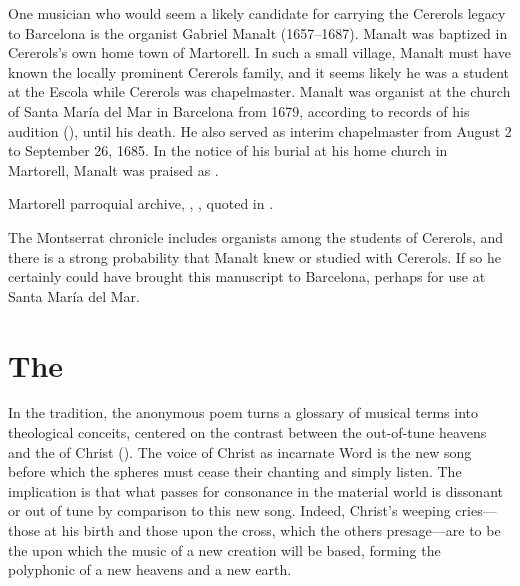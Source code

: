 
One musician who would seem a likely candidate for carrying the Cererols legacy
to Barcelona is the organist Gabriel Manalt (1657--1687).%
    \Autocite{Balanza:CererolsFamily}
Manalt was baptized in Cererols's own home town of Martorell.
In such a small village, Manalt must have known the locally prominent Cererols
family, and it seems likely he was a student at the Escola while Cererols was
chapelmaster.
Manalt was organist at the church of Santa María del Mar in Barcelona from 1679,
according to records of his audition (), until his death.
He also served as interim chapelmaster from August 2 to September 26, 1685.%
    \Autocite[70--71]{Balanza:CererolsFamily}
In the notice of his burial at his home church in Martorell, Manalt was praised
as .%
\begin{Footnote}
    Martorell parroquial archive, ,
    , quoted in 
    \autocite[70]{Balanza:CererolsFamily}.
\end{Footnote}
The Montserrat chronicle includes organists among the students of Cererols, and
there is a strong probability that Manalt knew or studied with Cererols.
If so he certainly could have brought this manuscript to Barcelona, perhaps
for use at Santa María del Mar.



\section{The }

In the  tradition, the anonymous poem turns a glossary of
musical terms into theological conceits, centered on the contrast between the
out-of-tune heavens and the  of Christ
().
The voice of Christ as incarnate Word is the new song before which the spheres
must cease their chanting and simply listen.
The implication is that what passes for consonance in the material world is
dissonant or out of tune by comparison to this new song.
Indeed, Christ's weeping cries---those at his birth and those upon the cross,
which the others presage---are to be the  upon which the
music of a new creation will be based, forming the polyphonic 
of a new heavens and a new earth.

